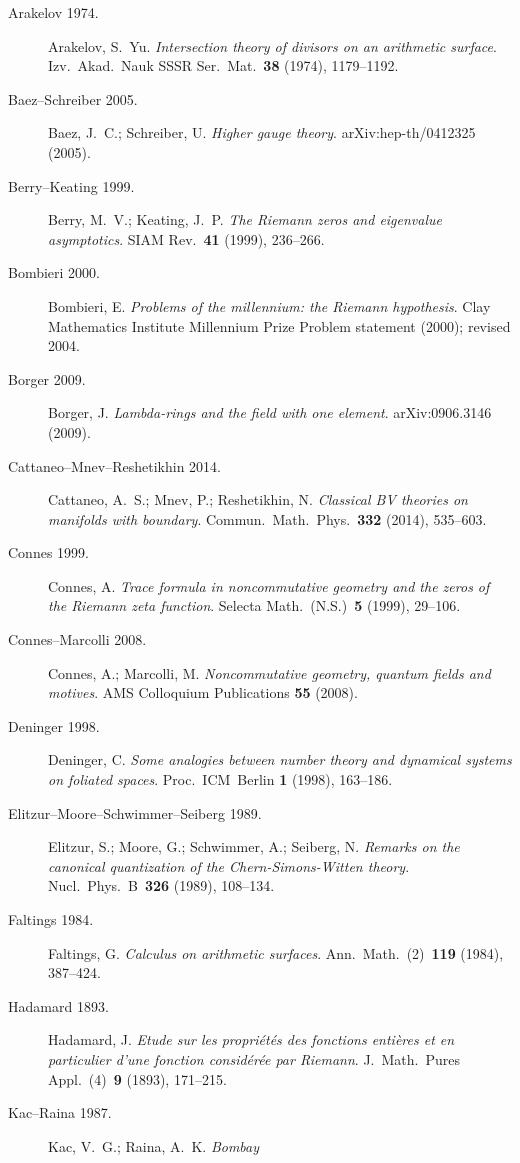 \begin{description}
\item[Arakelov 1974.] Arakelov, S.~Yu. \emph{Intersection theory of
divisors on an arithmetic surface}. Izv.~Akad.~Nauk SSSR
Ser.~Mat.~\textbf{38} (1974), 1179--1192.
\item[Baez--Schreiber 2005.] Baez, J.~C.; Schreiber, U.
\emph{Higher gauge theory}. arXiv:hep-th/0412325 (2005).
\item[Berry--Keating 1999.] Berry, M.~V.; Keating, J.~P.
\emph{The Riemann zeros and eigenvalue asymptotics}.
SIAM Rev.~\textbf{41} (1999), 236--266.
\item[Bombieri 2000.] Bombieri, E. \emph{Problems of the millennium:
the Riemann hypothesis}. Clay Mathematics Institute Millennium Prize
Problem statement (2000); revised 2004.
\item[Borger 2009.] Borger, J. \emph{Lambda-rings and the field with
one element}. arXiv:0906.3146 (2009).
\item[Cattaneo--Mnev--Reshetikhin 2014.] Cattaneo, A.~S.; Mnev, P.;
Reshetikhin, N. \emph{Classical BV theories on manifolds with
boundary}. Commun.~Math.~Phys.~\textbf{332} (2014), 535--603.
\item[Connes 1999.] Connes, A. \emph{Trace formula in noncommutative
geometry and the zeros of the Riemann zeta function}. Selecta
Math.~(N.S.)~\textbf{5} (1999), 29--106.
\item[Connes--Marcolli 2008.] Connes, A.; Marcolli, M.
\emph{Noncommutative geometry, quantum fields and motives}. AMS
Colloquium Publications \textbf{55} (2008).
\item[Deninger 1998.] Deninger, C. \emph{Some analogies between
number theory and dynamical systems on foliated spaces}.
Proc.~ICM~Berlin \textbf{1} (1998), 163--186.
\item[Elitzur--Moore--Schwimmer--Seiberg 1989.] Elitzur, S.; Moore,
G.; Schwimmer, A.; Seiberg, N. \emph{Remarks on the canonical
quantization of the Chern-Simons-Witten theory}.
Nucl.~Phys.~B~\textbf{326} (1989), 108--134.
\item[Faltings 1984.] Faltings, G. \emph{Calculus on arithmetic
surfaces}. Ann.~Math.~(2)~\textbf{119} (1984), 387--424.
\item[Hadamard 1893.] Hadamard, J. \emph{Etude sur les propri\'et\'es
des fonctions enti\`eres et en particulier d'une fonction consid\'er\'ee
par Riemann}. J.~Math.~Pures Appl.~(4)~\textbf{9} (1893), 171--215.
\item[Kac--Raina 1987.] Kac, V.~G.; Raina, A.~K. \emph{Bombay
}
\end{description}
